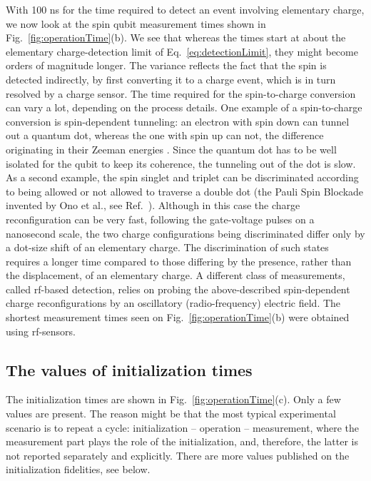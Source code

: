 \documentclass[aps, prx, showpacs, twocolumn, superscriptaddress, notitlepage, longbibliography, floatfix, nofootinbib]{revtex4-2}
\newcommand{\recheck}[1]{{#1}}
\begin{document}
With 100 ns for the time required to detect an event involving elementary charge, we now look at the spin qubit measurement times shown in Fig.~\ref{fig:operationTime}(b). \recheck{We see that whereas the times start at about the elementary charge-detection limit of Eq.~\eqref{eq:detectionLimit}, they might become orders of magnitude longer.} The variance reflects the fact that the spin is detected indirectly, by first converting it to a charge event, which is in turn resolved by a charge sensor. The time required for the spin-to-charge conversion can vary a lot, depending on the process details. One example of a spin-to-charge conversion is spin-dependent tunneling: an electron with spin down can tunnel out a quantum dot, whereas the one with spin up can not, the difference originating in their Zeeman energies \cite{hanson_zeeman_2003}. Since the quantum dot has to be well isolated for the qubit to keep its coherence, the tunneling out of the dot is slow. As a second example, the spin singlet and triplet can be discriminated according to being allowed or not allowed to traverse a double dot (the Pauli Spin Blockade invented by Ono et al., see Ref.~\cite{ono_current_2002}). Although in this case the charge reconfiguration can be very fast, following the gate-voltage pulses on a nanosecond scale, the two charge configurations being discriminated differ only by a dot-size shift of an elementary charge. The discrimination of such states requires a longer time compared to those differing by the presence, rather than the displacement, of an elementary charge. A different class of measurements, called rf-based detection, relies on probing the above-described spin-dependent charge reconfigurations by an oscillatory (radio-frequency) electric field. \recheck{The shortest measurement times seen on Fig.~\ref{fig:operationTime}(b) were obtained using rf-sensors.}

\subsection{The values of initialization times}

The initialization times are shown in Fig.~\ref{fig:operationTime}(c). \recheck{Only a few values are present.} The reason might be that the most typical experimental scenario is to repeat a cycle: initialization -- operation -- measurement, where the measurement part plays the role of the initialization, and, therefore, the latter is not reported separately and explicitly. \recheck{There are more values published on the initialization fidelities, see below.}
\end{document}
